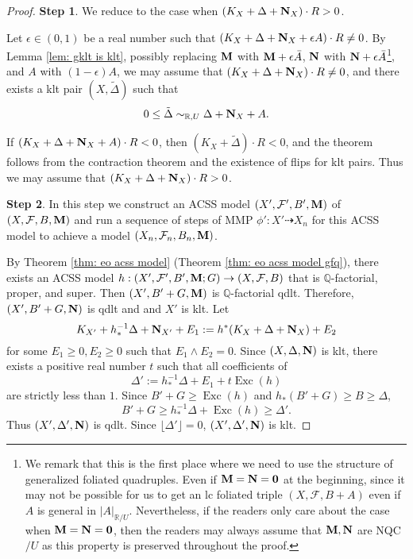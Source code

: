 \documentclass[11pt]{amsart}
\numberwithin{equation}{section}
\newcommand{\Mm}{{\bf{M}}}
\newcommand{\Nn}{{\bf{N}}}
\newcommand{\Qq}{\mathbb{Q}}
\newcommand{\Exc}{\operatorname{Exc}}
\newcommand{\Ff}{\mathcal{F}}
\theoremstyle{definition}
\theoremstyle{definition}
\theoremstyle{definition}
\begin{document}
\begin{proof}
\noindent\textbf{Step 1}. We reduce to the case when $(K_X+\Delta+\Nn_X)\cdot R>0$.

Let $\epsilon\in (0,1)$ be a real number such that $(K_X+\Delta+\Nn_X+\epsilon A)\cdot R\not=0$. By Lemma \ref{lem: gklt is klt}, possibly replacing $\Mm$ with $\Mm+\epsilon\bar A$, $\Nn$ with $\Nn+\epsilon\bar A$\footnote{We remark that this is the first place where we need to use the structure of generalized foliated quadruples. Even if $\Mm=\Nn=\bm{0}$ at the beginning, since it may not be possible for us to get an lc foliated triple $(X,\Ff,B+A)$ even if $A$ is general in $|A|_{\mathbb R/U}$. Nevertheless, if the readers only care about the case when $\Mm=\Nn=\bm{0}$, then the readers may always assume that $\Mm,\Nn$ are NQC$/U$ as this property is preserved throughout the proof.}, and $A$ with $(1-\epsilon)A$, we may assume that $(K_X+\Delta+\Nn_X)\cdot R\not=0$, and there exists a klt pair $(X,\tilde\Delta)$ such that
$$0\leq\tilde\Delta\sim_{\mathbb R,U}\Delta+\Nn_X+A.$$


If $(K_X+\Delta+\Nn_X+A)\cdot R<0$, then $(K_X+\tilde\Delta)\cdot R<0$, and the theorem follows from the  contraction theorem and the existence of flips for klt pairs. Thus we may assume that $(K_X+\Delta+\Nn_X)\cdot R>0$.

\medskip

\noindent\textbf{Step 2}. In this step we construct an ACSS model $(X',\Ff',B',\Mm)$ of $(X,\Ff,B,\Mm)$ and run a sequence of steps of MMP $\phi': X'\dashrightarrow X_n$ for this ACSS model to achieve a model $(X_n,\Ff_n,B_n,\Mm)$.

By Theorem \ref{thm: eo acss model} (Theorem \ref{thm: eo acss model gfq}), there exists an ACSS model $h: (X',\Ff',B',\Mm;G)\rightarrow (X,\Ff,B)$ that is $\Qq$-factorial, proper, and super. Then $(X',B'+G,\Mm)$ is $\Qq$-factorial qdlt. Therefore, $(X',B'+G,\Nn)$ is qdlt and and $X'$ is klt. Let 
$$K_{X'}+h^{-1}_*\Delta+\Nn_{X'}+E_1:=h^*(K_X+\Delta+\Nn_X)+E_2$$ for some $E_1\geq 0, E_2\geq 0$ such that $E_1\wedge E_2=0$. Since $(X,\Delta,\Nn)$ is klt, there exists a positive real number $t$ such that all coefficients of 
$$\Delta':=h^{-1}_*\Delta+E_1+t\Exc(h)$$
are strictly less than $1$. Since $B'+G\geq\Exc(h)$ and $h_*(B'+G)\geq B\geq\Delta$, $$B'+G\geq h^{-1}_*\Delta+\Exc(h)\geq\Delta'.$$
Thus $(X',\Delta',\Nn)$ is qdlt. Since $\lfloor\Delta'\rfloor=0$, $(X',\Delta',\Nn)$ is klt. 


\end{proof}
\end{document}

